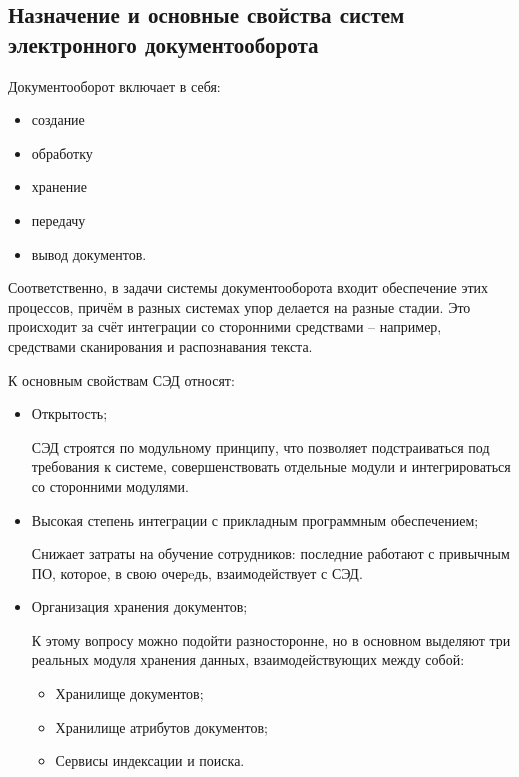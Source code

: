 \subsection{Назначение и основные свойства систем электронного документооборота} \label{review_common}

Документооборот включает в себя:
\begin{itemize}
	\item создание
	\item обработку
	\item хранение
	\item передачу
	\item вывод документов.
\end{itemize}

Соответственно, в задачи системы документооборота входит обеспечение этих процессов, причём в разных системах упор делается на разные стадии. Это происходит за счёт интеграции со сторонними средствами – например, средствами сканирования и распознавания текста.

\vspace{\baselineskip}
К основным свойствам СЭД относят:
\begin{itemize}
	\item Открытость;
		
		СЭД строятся по модульному принципу, что позволяет подстраиваться под требования к системе, совершенствовать отдельные модули и интегрироваться со сторонними модулями.
	\item Высокая степень интеграции с прикладным программным обеспечением;

	Снижает затраты на обучение сотрудников: последние работают с привычным ПО, которое, в свою очерeдь, взаимодействует с СЭД.
	\item Организация хранения документов;

	К этому вопросу можно подойти разносторонне, но в основном выделяют три реальных модуля хранения данных, взаимодействующих между собой:
	\begin{itemize}
		\item Хранилище документов;
		\item Хранилище атрибутов документов;
		\item Сервисы индексации и поиска.
	\end{itemize}
\end{itemize}

